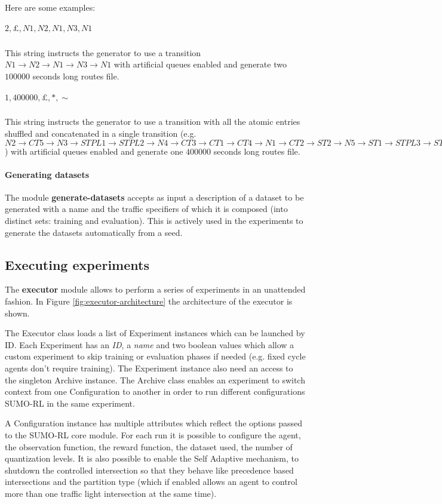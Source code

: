 Here are some examples:

\subparagraph{$2,\pounds,N1,N2,N1,N3,N1$}
This string instructs the generator to use a transition $N1 \rightarrow N2 \rightarrow N1 \rightarrow N3 \rightarrow N1$ with artificial queues enabled and generate two $100000$ seconds long routes file.

\subparagraph{$1,400000,\pounds,*,\sim$}
This string instructs the generator to use a transition with all the atomic entries shuffled and concatenated in a single transition (e.g. $N2 \rightarrow CT5 \rightarrow N3 \rightarrow STPL1 \rightarrow STPL2 \rightarrow N4 \rightarrow CT3 \rightarrow CT1 \rightarrow CT4 \rightarrow N1 \rightarrow CT2 \rightarrow ST2 \rightarrow N5 \rightarrow ST1 \rightarrow STPL3 \rightarrow ST3$) with artificial queues enabled and generate one $400000$ seconds long routes file.

\paragraph{Generating datasets}

The module \textbf{generate-datasets} accepts as input a description of a dataset to be generated with a name and the traffic specifiers of which it is composed (into distinct sets: training and evaluation).
This is actively used in the experiments to generate the datasets automatically from a seed.

\subsection{Executing experiments}

The \textbf{executor} module allows to perform a series of experiments in an unattended fashion.
In Figure \ref{fig:executor-architecture} the architecture of the executor is shown.

The Executor class loads a list of Experiment instances which can be launched by ID.
Each Experiment has an \textit{ID}, a \textit{name} and two boolean values which allow a custom experiment to skip training or evaluation phases if needed (e.g. fixed cycle agents don't require training).
The Experiment instance also need an access to the singleton Archive instance.
The Archive class enables an experiment to switch context from one Configuration to another in order to run different configurations SUMO-RL in the same experiment.

A Configuration instance has multiple attributes which reflect the options passed to the SUMO-RL core module.
For each run it is possible to configure the agent, the observation function, the reward function, the dataset used, the number of quantization levels.
It is also possible to enable the Self Adaptive mechanism, to shutdown the controlled intersection so that they behave like precedence based intersections and the partition type (which if enabled allows an agent to control more than one traffic light intersection at the same time).

